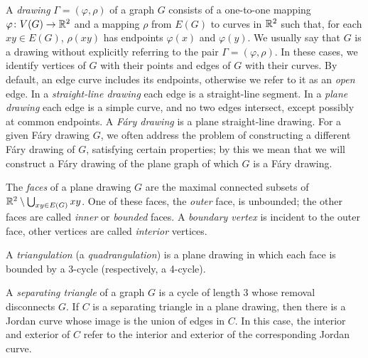 A \emph{drawing} $\Gamma=(\varphi,\rho)$ of a graph $G$ consists
of a one-to-one mapping $\varphi\colon V(G)\to\mathbb{R}^2$ and a mapping $\rho$ from
$E(G)$ to curves in $\mathbb{R}^2$ such that, for each $xy\in E(G)$, $\rho(xy)$
has endpoints $\varphi(x)$ and $\varphi(y)$.
We usually say that $G$ is a drawing
without explicitly referring to the pair $\Gamma=(\varphi,\rho)$.
In these cases, we identify vertices of $G$ with their
points and edges of $G$ with their curves. By default, an edge curve includes
its endpoints, otherwise we refer to it as an \emph{open} edge.
%
In a \emph{straight-line drawing} each edge is a straight-line segment. In a \emph{plane drawing} each edge is a simple curve, and no two edges intersect, except possibly at common endpoints. A \emph{F\'ary drawing} is a plane straight-line drawing. For a given F\'ary drawing $G$, we often address the problem of constructing a different F\'ary drawing of $G$, satisfying certain properties; by this we mean that we will construct a F\'ary drawing of the plane graph of which $G$ is a F\'ary drawing.

The \emph{faces} of a plane drawing $G$ are the maximal connected
subsets of $\mathbb{R}^2\setminus\bigcup_{xy\in E(G)} xy$.  One of
these faces, the \emph{outer} face, is unbounded; the other faces are called \emph{inner} or \emph{bounded} faces. A {\em boundary vertex} is incident to the outer face, other vertices are called \emph{interior} vertices.

A \emph{triangulation} (a \emph{quadrangulation}) is a plane drawing
in which each face is bounded by a 3-cycle (respectively, a 4-cycle). 

A \emph{separating triangle} of a graph $G$ is
a cycle of length 3
 whose removal disconnects $G$.
 If
 $C$ is a separating triangle in a plane drawing, then
 there is a 
Jordan curve whose image
is the union of edges in $C$.  In this case, the interior and exterior of
$C$ refer to the interior and exterior of the corresponding Jordan curve.

